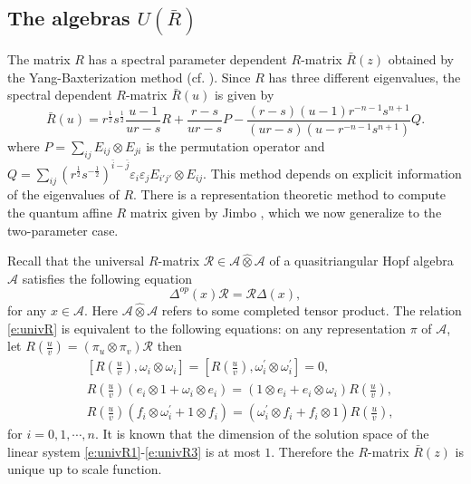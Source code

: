 \documentclass[10pt,a4paper]{amsart}
\numberwithin{equation}{section}
\begin{document}
	\subsection{The algebras $U(\bar{R})$}
The matrix $R$ has a spectral parameter dependent $R$-matrix $\bar{R}(z)$ obtained by the Yang-Baxterization method (cf. \cite{GWX}).
Since $R$ has three different eigenvalues, the spectral dependent $R$-matrix $\bar{R}(u)$ is given by
$$
\bar{R}(u)=r^{\frac{1}{2}} s^{\frac{1}{2}} \frac{u-1}{u r-s} R+\frac{r-s}{u r-s} P-\frac{(r-s)(u-1) r^{-n-1} s^{n+1}}{(u r-s)\left(u-r^{-n-1} s^{n+1}\right)} Q.
$$
where $P=\sum_{ij}E_{ij}\otimes E_{ji}$ is the permutation operator and $Q=\sum_{ij}(r^{\frac{1}{2}}s^{-\frac{1}{2}})^{\bar{i}-\bar{j}}\varepsilon_{i}\varepsilon_{j}E_{i'j'}\otimes E_{ij}$.
This method depends on explicit information of the eigenvalues of $R$. There is a
representation theoretic method to compute the quantum affine $R$ matrix given by Jimbo \cite{J}, which we now generalize to the
two-parameter case.






Recall that the universal $R$-matrix $\mathcal{R}\in \mathcal{A} \hat{\otimes} \mathcal{A}$ of a quasitriangular Hopf algebra $\mathcal{A}$ satisfies the following equation
\begin{equation}\label{e:univR}
\Delta^{o p}(x) \mathcal{R}=\mathcal{R} \Delta(x),
\end{equation}
for any $x \in \mathcal{A}$. Here $\mathcal{A} \hat{\otimes} \mathcal{A}$ refers to some completed tensor product. The relation \eqref{e:univR} is
equivalent to the following equations: on any representation $\pi$ of $\mathcal{A}$, let $R\left(\frac{u}{v}\right)=\left(\pi_u \otimes \pi_v\right) \mathcal{R}$ then
\begin{align}\label{e:univR1}
&\left[R\left(\frac{u}{v}\right), \omega_i \otimes \omega_i\right]=\left[R\left(\frac{u}{v}\right), \omega_i^{\prime} \otimes \omega_i^{\prime}\right]=0,\\
\label{e:univR2}
& R\left(\frac{u}{v}\right)\left(e_i \otimes 1+\omega_i \otimes e_i\right)=\left(1 \otimes e_i+e_i \otimes \omega_i\right) R\left(\frac{u}{v}\right),\\ \label{e:univR3}
&R\left(\frac{u}{v}\right)\left(f_i \otimes \omega_i^{\prime}+1 \otimes f_i\right)=\left(\omega_i^{\prime} \otimes f_i+f_i \otimes 1\right) R\left(\frac{u}{v}\right),
\end{align}
for $i=0,1, \cdots ,n$. It is known \cite{J} that the dimension of the solution space of the linear system \eqref{e:univR1}-\eqref{e:univR3} is at most $1$.
Therefore the $R$-matrix $\bar{R}(z)$ is unique up to scale function.
	
\end{document}
